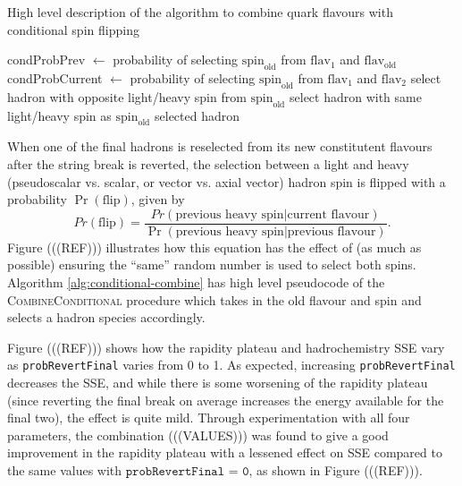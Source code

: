 \documentclass[12pt,a4paper]{report}
\begin{document}
\begin{algorithm}
  \caption{High level description of the algorithm to combine quark flavours with conditional spin flipping}
  \label{alg:conditional-combine}
  \begin{algorithmic}
      \State condProbPrev $\gets$ probability of selecting $\text{spin}_\text{old}$ from $\text{flav}_1$ and $\text{flav}_\text{old}$
      \State condProbCurrent $\gets$ probability of selecting $\text{spin}_\text{old}$ from $\text{flav}_1$ and $\text{flav}_2$
        \State select hadron with opposite light/heavy spin from $\text{spin}_\text{old}$
      \Else
        \State select hadron with same light/heavy spin as $\text{spin}_\text{old}$
      \EndIf
      \State \Return selected hadron
    \EndProcedure
  \end{algorithmic}
\end{algorithm}


When one of the final hadrons is reselected from its new constitutent flavours after the string break is reverted, the selection between a light and heavy (pseudoscalar vs. scalar, or vector vs. axial vector) hadron spin is flipped with a probability $\Pr(\text{flip})$, given by
\begin{equation}
  Pr(\text{flip}) = \frac{Pr(\text{previous heavy spin} | \text{current flavour})}{\Pr(\text{previous heavy spin} | \text{previous flavour})}.
\end{equation}
Figure (((REF))) illustrates how this equation has the effect of (as much as possible) ensuring the ``same'' random number is used to select both spins. Algorithm \ref{alg:conditional-combine} has high level pseudocode of the \textsc{CombineConditional} procedure which takes in the old flavour and spin and selects a hadron species accordingly.

Figure (((REF))) shows how the rapidity plateau and hadrochemistry SSE vary as \texttt{probRevertFinal} varies from 0 to 1. As expected, increasing \texttt{probRevertFinal} decreases the SSE, and while there is some worsening of the rapidity plateau (since reverting the final break on average increases the energy available for the final two), the effect is quite mild. Through experimentation with all four parameters, the combination (((VALUES))) was found to give a good improvement in the rapidity plateau with a lessened effect on SSE compared to the same values with $\texttt{probRevertFinal = 0}$, as shown in Figure (((REF))).
\end{document}
